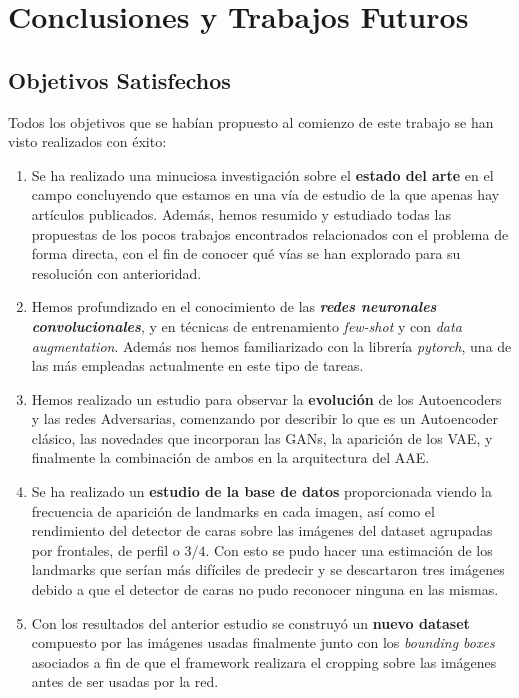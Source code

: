 \chapter{Conclusiones y Trabajos Futuros}

\section{Objetivos Satisfechos}

Todos los objetivos que se habían propuesto al comienzo de este trabajo se han visto realizados con éxito:

\begin{enumerate}
    \item Se ha realizado una minuciosa investigación sobre el \textbf{estado del arte} en el campo concluyendo que estamos en una vía de estudio de la que apenas hay artículos publicados. Además, hemos resumido y estudiado todas las propuestas de los pocos trabajos encontrados relacionados con el problema de forma directa, con el fin de conocer qué vías se han explorado para su resolución con anterioridad.
    \item Hemos profundizado en el conocimiento de las \textbf{\textit{redes neuronales convolucionales}}, y en técnicas de entrenamiento \textit{few-shot} y con \textit{data augmentation}. Además nos hemos familiarizado con la librería \textit{pytorch}, una de las más empleadas actualmente en este tipo de tareas.
    \item Hemos realizado un estudio para observar la \textbf{evolución} de los Autoencoders y las redes Adversarias, comenzando por describir lo que es un Autoencoder clásico, las novedades que incorporan las GANs, la aparición de los VAE, y finalmente la combinación de ambos en la arquitectura del AAE.
    \item Se ha realizado un \textbf{estudio de la base de datos} proporcionada viendo la frecuencia de aparición de landmarks en cada imagen, así como el rendimiento del detector de caras sobre las imágenes del dataset agrupadas por frontales, de perfil o $3/4$. Con esto se pudo hacer una estimación de los landmarks que serían más difíciles de predecir y se descartaron tres imágenes debido a que el detector de caras no pudo reconocer ninguna en las mismas.
    \item Con los resultados del anterior estudio se construyó un \textbf{nuevo dataset} compuesto por las imágenes usadas finalmente junto con los \textit{bounding boxes} asociados a fin de que el framework realizara el cropping sobre las imágenes antes de ser usadas por la red.

\end{enumerate}
